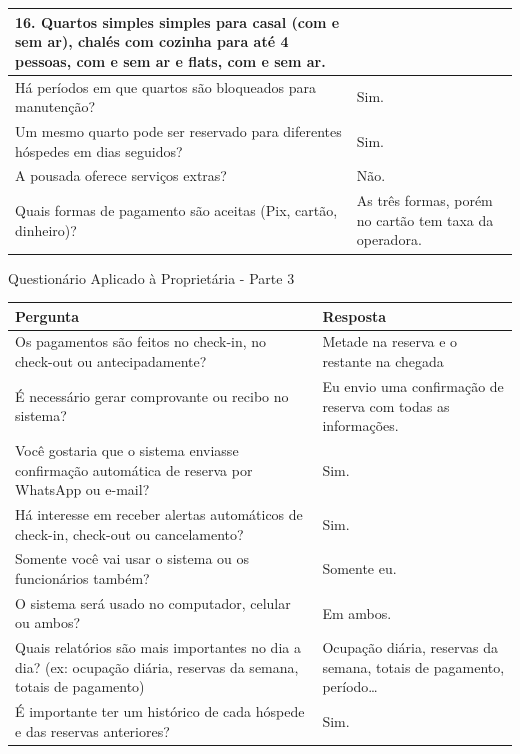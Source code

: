 \documentclass[
	12pt,				%
	openany,			%
	twoside,			%
	a4paper,			%
	english,			%
	french,				%
	spanish,			%
	brazil				%
	]{abntex2}
\begin{document}
\begin{quadro}[H]
\begin{tabular}{|p{7.5cm}|p{7.5cm}|}
		16. Quartos simples simples para casal (com e sem ar), chalés com cozinha para até 4 pessoas, com e sem ar e flats, com e sem ar. 
		\\ \hline
		Há períodos em que quartos são bloqueados para manutenção? &
		Sim.
		\\ \hline
		Um mesmo quarto pode ser reservado para diferentes hóspedes em dias seguidos? &
		Sim.
		\\ \hline
		A pousada oferece serviços extras? &
		Não. 
		\\ \hline
		Quais formas de pagamento são aceitas (Pix, cartão, dinheiro)? &
		As três formas, porém no cartão tem taxa da operadora. 
		\\ \hline
\end{tabular}
\end{quadro}
%		
\begin{quadro}[H]
	\caption{Questionário Aplicado à Proprietária - Parte 3}
	\label{questionario_3}
	\begin{tabular}{|p{7.5cm}|p{7.5cm}|}
		\hline
		\textbf{Pergunta} & \textbf{Resposta}  \\ \hline
		Os pagamentos são feitos no check-in, no check-out ou antecipadamente? &
		Metade na reserva e o restante na chegada
		\\ \hline
		É necessário gerar comprovante ou recibo no sistema? &
		Eu envio uma confirmação de reserva com todas as informações.
		\\ \hline
		Você gostaria que o sistema enviasse confirmação automática de reserva por WhatsApp ou e-mail? &
		Sim.
		\\ \hline		
		Há interesse em receber alertas automáticos de check-in, check-out ou cancelamento? &
		Sim.
		\\ \hline
		Somente você vai usar o sistema ou os funcionários também? &
		Somente eu.
		\\ \hline
		O sistema será usado no computador, celular ou ambos? &
		Em ambos.
		\\ \hline
		Quais relatórios são mais importantes no dia a dia? (ex: ocupação diária, reservas da semana, totais de pagamento) &
		Ocupação diária, reservas da semana, totais de pagamento, período…
		\\ \hline
		É importante ter um histórico de cada hóspede e das reservas anteriores?
		& Sim.
		\\ \hline
\end{tabular}
	\end{quadro}
\end{document}
